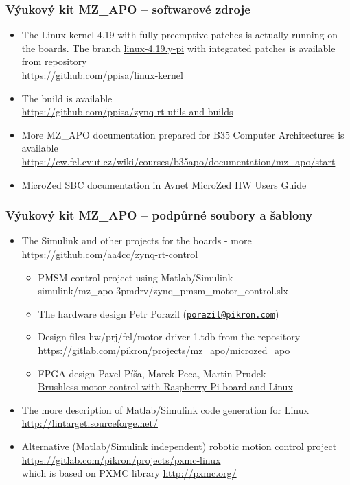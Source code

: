 \documentclass{beamer}
\begin{document}
\begin{frame}
\frametitle{Výukový kit MZ\_APO -- softwarové zdroje}

\begin{itemize}
\item The Linux kernel 4.19 with fully preemptive patches is actually
  running on the boards. The branch
  \href{https://github.com/ppisa/linux-kernel/commits/linux-4.19.y-pi}{linux-4.19.y-pi}
  with integrated patches is available from repository \\
  \url{https://github.com/ppisa/linux-kernel}
\item
  The build is available \\
  \url{https://github.com/ppisa/zynq-rt-utils-and-builds}
\item
  More MZ\_APO documentation prepared for B35 Computer Architectures is
  available \\
  \url{https://cw.fel.cvut.cz/wiki/courses/b35apo/documentation/mz_apo/start}
\item
  MicroZed SBC documentation in Avnet MicroZed HW Users Guide
\end{itemize}

\end{frame}


\begin{frame}
\frametitle{Výukový kit MZ\_APO -- podpůrné soubory a šablony}

\begin{itemize}
\item The Simulink and other projects for the boards - more \\
      \url{https://github.com/aa4cc/zynq-rt-control}
\begin{itemize}
\item PMSM control project using Matlab/Simulink \\
      simulink/mz\_apo-3pmdrv/zynq\_pmsm\_motor\_control.slx
\item The hardware design Petr Porazil
  (\href{mailto:porazil@pikron.com}{\nolinkurl{porazil@pikron.com}})
\item Design files hw/prj/fel/motor-driver-1.tdb from the repository \\
  \url{https://gitlab.com/pikron/projects/mz_apo/microzed_apo}
\item FPGA design Pavel Píša, Marek Peca, Martin Prudek \\
  \href{https://dspace.cvut.cz/bitstream/handle/10467/62036/F3-BP-2015-Prudek-Martin-Bp_2015_prudek_martin.pdf}{Brushless motor control with Raspberry Pi board and Linux}
\end{itemize}
\item The more description of Matlab/Simulink code generation for Linux \\
  \url{http://lintarget.sourceforge.net/}
\item Alternative (Matlab/Simulink independent) robotic motion control project \\
  \url{https://gitlab.com/pikron/projects/pxmc-linux} \\
  which is based on PXMC library \url{http://pxmc.org/}
\end{itemize}

\end{frame}
\end{document}
